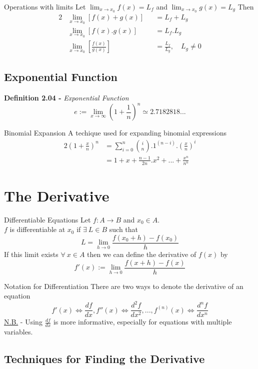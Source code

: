 \documentclass[11pt,a4paper]{article}
\begin{document}
\subtitle{Theorem 2.03 - }{Operations with limits}
Let $\lim_{x \to x_0} f(x) = L_f$ and $\lim_{x \to x_0} g(x) = L_g$
Then
\begin{alignat*}{2}
  &\lim_{x \to x_0} \left[f(x) + g(x)\right] &&= L_f + L_g \\
  &\lim_{x \to x_0} \left[f(x).g(x)\right] &&= L_f.L_g \\
  &\lim_{x \to x_0} \left[\frac{f(x)}{g(x)}\right] &&= \frac{L_f}{L_g},\quad L_g \not = 0
\end{alignat*}

\subsection{Exponential Function}
\textbf{Definition 2.04 - }\textit{Exponential Function}
$$e := \lim_{x \to \infty} \left(1+\frac{1}{n}\right)^n \simeq 2.7182818...$$

\subtitle{Theorem 2.05 - }{Binomial Expansion}
A techique used for expanding binomial expressions
\begin{alignat*}{2}
\left(1+\frac{x}{n}\right)^n &= \sum_{i=0}^{n} \binom{i}{n} . 1^{(n-i)} . \left(\frac{x}{n}\right)^i \\
&= 1 + x + \frac{n-1}{2n}.x^2 + ... + \frac{x^n}{n^n}
\end{alignat*}

\section{The Derivative}

\subtitle{Definition 3.01 - }{Differentiable Equations}
Let $f : A \to B$ and $x_0 \in A$. \\
$f$ is differentiable at $x_0$ if $\exists\ L \in B$ such that $$L = \lim_{h \to 0} \frac{f(x_0 + h)-f(x_0)}{h}$$
If this limit exists $\forall\ x \in A$ then we can define the derivative of $f(x)$ by
$$f'(x) := \lim_{h \to 0} \frac{f(x + h) -f(x)}{h}$$

\subtitle{Definition 3.02 - }{Notation for Differentiation}
There are two ways to denote the derivative of an equation $$f'(x) \iff \frac{df}{dx}, f''(x) \iff \frac{d^2f}{dx^2}, ... , f^{(n)}(x) \iff \frac{d^nf}{dx^n}$$
\underline{N.B.} - Using $\displaystyle{\frac{df}{dx}}$ is more informative, especially for equations with multiple variables.

\subsection{Techniques for Finding the Derivative}
\end{document}
